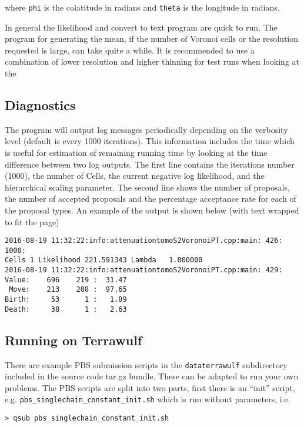 \documentclass{article}
\begin{document}
where {\tt phi} is the colatitude in radians and {\tt theta} is the longitude in radians.

In general the likelihood and convert to text program are quick to run. The program for
generating the mean, if the number of Voronoi cells or the resolution requested is large,
can take quite a while. It is recommended to use a combination of lower resolution and
higher thinning for test runs when looking at the 

\subsection{Diagnostics}

The program will output log messages periodically depending on the verbosity level (default is
every 1000 iterations). This information includes the time which is useful for estimation of
remaining running time by looking at the time difference between two log outputs.
The first line contains the iterations number (1000), the number of Cells, the current negative log likelihood,
and the hierarchical scaling parameter. The second line shows the number of proposals, the number of
accepted proposals and the percentage acceptance rate for each of the proposal types. An example of
the output is shown below (with text wrapped to fit the page)

\begin{verbatim}
2016-08-19 11:32:22:info:attenuationtomoS2VoronoiPT.cpp:main: 426: 1000: 
Cells 1 Likelihood 221.591343 Lambda   1.000000
2016-08-19 11:32:22:info:attenuationtomoS2VoronoiPT.cpp:main: 429:         
Value:    696    219 :  31.47
 Move:    213    208 :  97.65
Birth:     53      1 :   1.89
Death:     38      1 :   2.63
\end{verbatim}


\subsection{Running on Terrawulf}

There are example PBS submission scripts in the {\tt dataterrawulf} subdirectory
included in the source code tar.gz bundle. These can be adapted to run your own
problems. The PBS scripts are split into two parts, first there is an ``init''
script, e.g. {\tt pbs\_singlechain\_constant\_init.sh} which is run without
parameters, i.e.

\begin{verbatim}
> qsub pbs_singlechain_constant_init.sh 
\end{verbatim}
\end{document}
